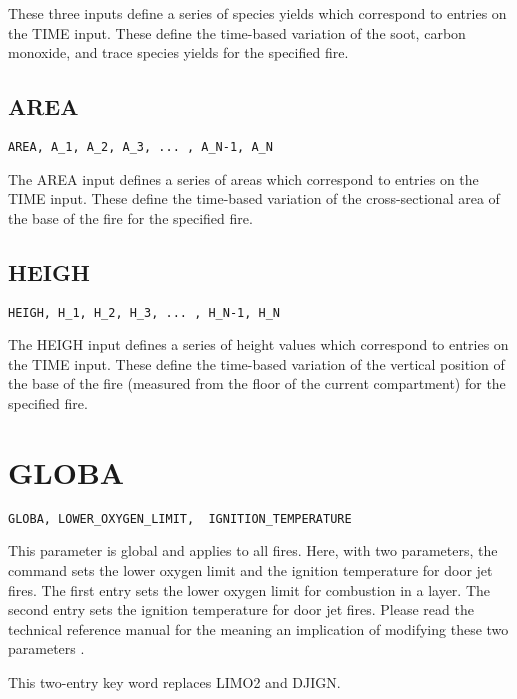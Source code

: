These three inputs define a series of species yields which correspond to entries on the TIME input.  These define the time-based variation of the soot, carbon monoxide, and trace species yields for the specified fire.

\subsection{AREA}

\begin{lstlisting}
AREA, A_1, A_2, A_3, ... , A_N-1, A_N
\end{lstlisting}

The AREA input defines a series of areas which correspond to entries on the TIME input.  These define the time-based variation of the cross-sectional area of the base of the fire for the specified fire.

\subsection{HEIGH}

\begin{lstlisting}
HEIGH, H_1, H_2, H_3, ... , H_N-1, H_N
\end{lstlisting}

The HEIGH input defines a series of height values which correspond to entries on the TIME input.  These define the time-based variation of the vertical position of the base of the fire (measured from the floor of the current compartment) for the specified fire.

\section{GLOBA}

\begin{lstlisting}
GLOBA, LOWER_OXYGEN_LIMIT,  IGNITION_TEMPERATURE
\end{lstlisting}

This parameter is global and applies to all fires. Here, with two parameters, the command sets the lower oxygen limit and the ignition temperature for door jet fires. The first entry sets the lower oxygen limit for combustion in a layer. The second entry sets the ignition temperature for door jet fires. Please read the technical reference manual for the meaning an implication of modifying these two parameters \cite{CFAST_Tech_Guide_6}.

This two-entry key word replaces LIMO2 and DJIGN.

